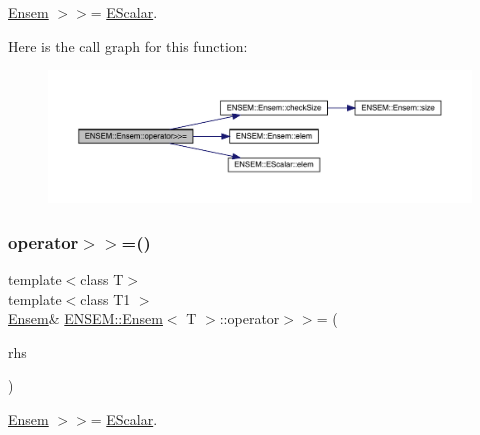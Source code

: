 \mbox{\hyperlink{classENSEM_1_1Ensem}{Ensem}} $>$$>$= \mbox{\hyperlink{classENSEM_1_1EScalar}{E\+Scalar}}. 

Here is the call graph for this function\+:
\nopagebreak
\begin{figure}[H]
\begin{center}
\leavevmode
\includegraphics[width=350pt]{d7/d3e/classENSEM_1_1Ensem_a9511b1d1b45de39920d451700eecd4d9_cgraph}
\end{center}
\end{figure}
\mbox{\label{classENSEM_1_1Ensem_a9511b1d1b45de39920d451700eecd4d9}} 
\subsubsection{\texorpdfstring{operator$>$$>$=()}{operator>>=()}\hspace{0.1cm}{\footnotesize\ttfamily [2/3]}}
{\footnotesize\ttfamily template$<$class T$>$ \\
template$<$class T1 $>$ \\
\mbox{\hyperlink{classENSEM_1_1Ensem}{Ensem}}\& \mbox{\hyperlink{classENSEM_1_1Ensem}{E\+N\+S\+E\+M\+::\+Ensem}}$<$ T $>$\+::operator$>$$>$= (\begin{DoxyParamCaption}\item[{const \mbox{\hyperlink{classENSEM_1_1EScalar}{E\+Scalar}}$<$ T1 $>$ \&}]{rhs }\end{DoxyParamCaption})\hspace{0.3cm}{\ttfamily [inline]}}



\mbox{\hyperlink{classENSEM_1_1Ensem}{Ensem}} $>$$>$= \mbox{\hyperlink{classENSEM_1_1EScalar}{E\+Scalar}}. 

